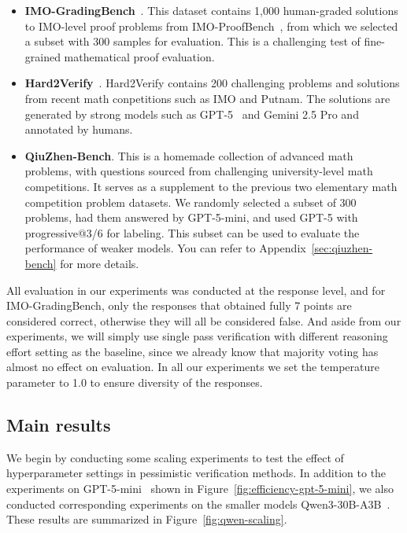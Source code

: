 \documentclass{article} %
\begin{document}
\begin{itemize}
  \item \textbf{IMO-GradingBench}~\citep{luong_towards_2025}. This dataset contains 1,000 human-graded solutions to IMO-level proof problems from IMO-ProofBench~\citep{luong_towards_2025}, from which we selected a subset with 300 samples for evaluation. This is a challenging test of fine-grained mathematical proof evaluation.
  \item \textbf{Hard2Verify}~\citep{pandit_hard2verify_2025}. Hard2Verify contains 200 challenging problems and solutions from recent math conpetitions such as IMO and Putnam. The solutions are generated by strong models such as GPT-5~\citep{openai_gpt5_system_card_2025} and Gemini 2.5 Pro\citep{google_gemini25pro} and annotated by humans.
  \item \textbf{QiuZhen-Bench}. This is a homemade collection of advanced math problems, with questions sourced from challenging university-level math competitions. It serves as a supplement to the previous two elementary math competition problem datasets. We randomly selected a subset of 300 problems, had them answered by GPT-5-mini, and used GPT-5 with progressive@3/6 for labeling. This subset can be used to evaluate the performance of weaker models. You can refer to Appendix~\ref{sec:qiuzhen-bench} for more details.
\end{itemize}

All evaluation in our experiments was conducted at the response level, and for IMO-GradingBench, only the responses that obtained fully 7 points are considered correct, otherwise they will all be considered false. And aside from our experiments, we will simply use single pass verification with different reasoning effort setting as the baseline, since we already know that majority voting has almost no effect on evaluation. In all our experiments we set the temperature parameter to 1.0 to ensure diversity of the responses.

\subsection{Main results}

We begin by conducting some scaling experiments to test the effect of hyperparameter settings in pessimistic verification methods. In addition to the experiments on GPT-5-mini~\citep{openai_gpt5_system_card_2025} shown in Figure~\ref{fig:efficiency-gpt-5-mini}, we also conducted corresponding experiments on the smaller models Qwen3-30B-A3B~\citep{yang_qwen3_2025}. These results are summarized in Figure~\ref{fig:qwen-scaling}.
\end{document}

